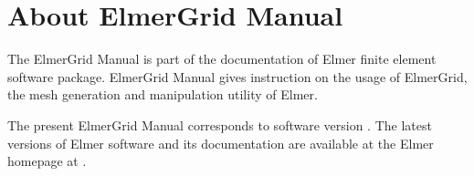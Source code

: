 \chapter*{About ElmerGrid Manual}

The ElmerGrid Manual is part of the documentation of 
Elmer finite element software package.
ElmerGrid Manual gives instruction 
on the usage of ElmerGrid, the mesh generation and manipulation utility of Elmer.

The present ElmerGrid Manual
corresponds to software version \elmerversion{}.
The latest versions of Elmer software and its documentation
are available at the Elmer homepage at
. 


